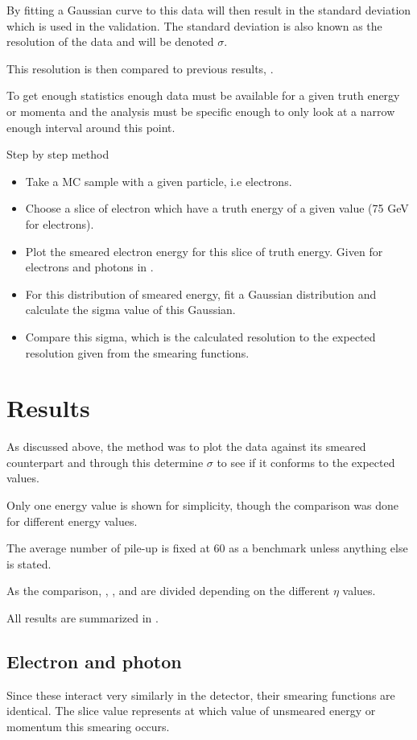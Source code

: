 By fitting a Gaussian curve to this data will then result in the standard deviation which is used in the validation. The standard deviation is also known as the resolution of the data and will be denoted $\sigma$.

This resolution is then compared to previous results, \citep{ATL-PHYS-PUB-2013-004}.

To get enough statistics enough data must be available for a given truth energy or momenta and the analysis must be specific enough to only look at a narrow enough interval around this point.

Step by step method
\begin{itemize}
\item Take a MC sample with a given particle, i.e electrons.
\item Choose a slice of electron which have a truth energy of a given value (75 GeV for electrons).
\item Plot the smeared electron energy for this slice of truth energy. Given for electrons and photons in .
\item For this distribution of smeared energy, fit a Gaussian distribution and calculate the sigma value of this Gaussian.
\item Compare this sigma, which is the calculated resolution to the expected resolution given from the smearing functions.
\end{itemize}

\newpage
\section{Results}\label{cha:vali:sec:results}
As discussed above, the method was to plot the data against its smeared counterpart and through this determine $\sigma$ to see if it conforms to the expected values.

Only one energy value is shown for simplicity, though the comparison was done for different energy values.

The average number of pile-up is fixed at 60 as a benchmark unless anything else is stated.

As the comparison, , ,  and  are divided depending on the different $\eta$ values.

All results are summarized in . 
\newpage
\subsection{Electron and photon}\label{cha:vali:sec:res:subsec:elph}
Since these interact very similarly in the detector, their smearing functions are identical.
The slice value represents at which value of unsmeared energy or momentum this smearing occurs. 

